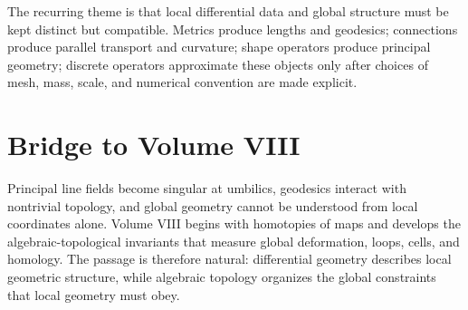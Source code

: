 The recurring theme is that local differential data and global structure must be
kept distinct but compatible.  Metrics produce lengths and geodesics; connections
produce parallel transport and curvature; shape operators produce principal
geometry; discrete operators approximate these objects only after choices of
mesh, mass, scale, and numerical convention are made explicit.

\section{Bridge to Volume VIII}

Principal line fields become singular at umbilics, geodesics interact with
nontrivial topology, and global geometry cannot be understood from local
coordinates alone.  Volume VIII begins with homotopies of maps and develops the
algebraic-topological invariants that measure global deformation, loops, cells,
and homology.  The passage is therefore natural: differential geometry describes
local geometric structure, while algebraic topology organizes the global
constraints that local geometry must obey.
